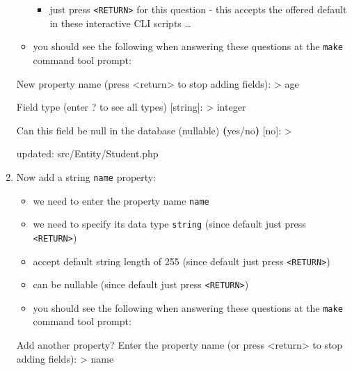\documentclass[a4paperpaper,openright]{book}
\newenvironment{Shaded}{}{}
\newcommand{\BuiltInTok}[1]{#1}
\newcommand{\ExtensionTok}[1]{#1}
\newcommand{\KeywordTok}[1]{\textcolor[rgb]{0.00,0.44,0.13}{\textbf{#1}}}
\newcommand{\NormalTok}[1]{#1}
\newcommand{\OperatorTok}[1]{\textcolor[rgb]{0.40,0.40,0.40}{#1}}
\providecommand{\tightlist}{%
  \setlength{\itemsep}{0pt}\setlength{\parskip}{0pt}}
\begin{document}
\begin{enumerate}
\begin{itemize}
    \begin{itemize}
    \tightlist
    \item
      just press \texttt{\textless{}RETURN\textgreater{}} for this
      question - this accepts the offered default in these interactive
      CLI scripts \ldots{}
    \end{itemize}
  \item
    you should see the following when answering these questions at the
    \texttt{make} command tool prompt:
  \end{itemize}

\begin{Shaded}
\begin{Highlighting}[]
     \ExtensionTok{New}\NormalTok{ property name (press }\OperatorTok{<}\NormalTok{return}\OperatorTok{>}\NormalTok{ to stop adding fields)}\BuiltInTok{:}
     \OperatorTok{>} \ExtensionTok{age}

     \ExtensionTok{Field}\NormalTok{ type (enter ? to see all types) [}\ExtensionTok{string}\NormalTok{]:}
     \OperatorTok{>} \ExtensionTok{integer}

     \ExtensionTok{Can}\NormalTok{ this field be null in the database (nullable) }\KeywordTok{(}\ExtensionTok{yes/no}\KeywordTok{)}\NormalTok{ [}\ExtensionTok{no}\NormalTok{]:}
     \OperatorTok{>} 

     \ExtensionTok{updated}\NormalTok{: src/Entity/Student.php}
\end{Highlighting}
\end{Shaded}
\item
  Now add a string \texttt{name} property:

  \begin{itemize}
  \item
    we need to enter the property name \texttt{name}
  \item
    we need to specify its data type \texttt{string} (since default just
    press \texttt{\textless{}RETURN\textgreater{}})
  \item
    accept default string length of 255 (since default just press
    \texttt{\textless{}RETURN\textgreater{}})
  \item
    can be nullable (since default just press
    \texttt{\textless{}RETURN\textgreater{}})
  \item
    you should see the following when answering these questions at the
    \texttt{make} command tool prompt:
  \end{itemize}

\begin{Shaded}
\begin{Highlighting}[]
     \ExtensionTok{Add}\NormalTok{ another property? Enter the property name (or press }\OperatorTok{<}\NormalTok{return}\OperatorTok{>}\NormalTok{ to stop adding fields)}\BuiltInTok{:}
     \OperatorTok{>} \ExtensionTok{name}


\end{Highlighting}
\end{Shaded}
\end{enumerate}
\end{document}

